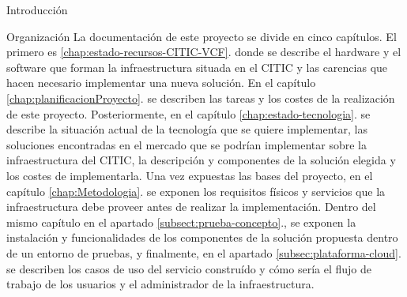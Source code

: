 \begin{chapter}{Introducción}
\begin{section}{Organización}
    La documentación de este proyecto se divide en cinco capítulos. El primero es \ref{chap:estado-recursos-CITIC-VCF}. donde se describe el hardware y el software que forman la infraestructura situada en el CITIC y las carencias que hacen necesario implementar una nueva solución. En el capítulo \ref{chap:planificacionProyecto}. se describen las tareas y los costes de la realización de este proyecto. Posteriormente, en el capítulo \ref{chap:estado-tecnologia}. se describe la situación actual de la tecnología que se quiere implementar, las soluciones encontradas en el mercado que se podrían implementar sobre la infraestructura del CITIC, la descripción y componentes de la solución elegida y los costes de implementarla. Una vez expuestas las bases del proyecto, en el capítulo \ref{chap:Metodologia}. se exponen los requisitos físicos y servicios que la infraestructura debe proveer antes de realizar la implementación. Dentro del mismo capítulo en el apartado \ref{subsect:prueba-concepto}., se exponen la instalación y funcionalidades de los componentes de la solución propuesta dentro de un entorno de pruebas, y finalmente, en el apartado \ref{subsec:plataforma-cloud}. se describen los casos de uso del servicio construído y cómo sería el flujo de trabajo de los usuarios y el administrador de la infraestructura.
\end{section}

\end{chapter}